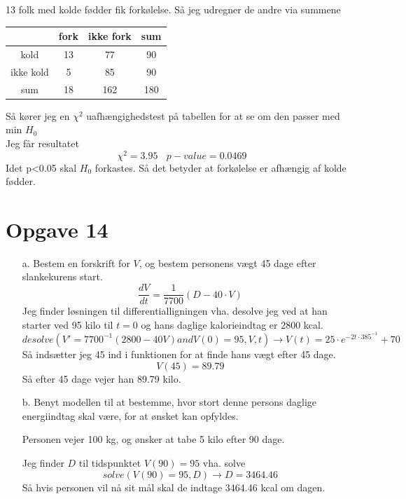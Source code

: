 \documentclass[12pt]{article}
\begin{document}
\begin{enumerate}
                13 folk med kolde fødder fik forkølelse. Så jeg udregner de andre
                via summene
                \begin{center}
                        \begin{tabular}{c | c | c | c}
                                & fork & ikke fork & sum \\ \hline
                                kold &13&77& 90 \\ \hline
                                ikke kold &5&85& 90 \\ \hline
                                sum & 18 & 162 & 180 \\
                        \end{tabular}
                \end{center}
                Så kører jeg en $\chi^2$ uafhængighedstest på tabellen for
                at se om den passer med min $H_0$\\
                Jeg får resultatet
                $$\chi^2 = 3.95~~~~p-value=0.0469$$
                Idet p<0.05 skal $H_0$ forkastes.
                Så det betyder at forkølelse er afhængig af kolde fødder.

\end{enumerate}

\section*{Opgave 14}

\begin{enumerate}

        \item[a.] Bestem en forskrift for $V$, og bestem personens vægt 45 dage
                efter slankekurens start.
                $$\frac{dV}{dt} = \frac{1}{7700}(D-40\cdot V)$$
                Jeg finder løsningen til differentialligningen vha. desolve jeg
                ved at han starter ved 95 kilo til $t = 0$ og hans daglige
                kalorieindtag er 2800 kcal.
                $$desolve(V'=7700^{-1}(2800-40V) and V(0) = 95,V,t) \rightarrow
                V(t) = 25\cdot e^{-2t\cdot 385^{-1}}+70$$
                Så indsætter jeg 45 ind i funktionen for at finde hans vægt
                efter 45 dage.
                $$V(45) = 89.79$$
                Så efter 45 dage vejer han 89.79 kilo.

        \item[b.] Benyt modellen til at bestemme, hvor stort denne persons
                daglige energiindtag skal være, for at ønsket kan opfyldes.

                Personen vejer 100 kg, og ønsker at tabe 5 kilo efter 90 dage.

                Jeg finder $D$ til tidspunktet $V(90)=95$ vha. solve
                $$solve(V(90) = 95,D) \rightarrow D = 3464.46$$
                Så hvis personen vil nå sit mål skal de indtage
                3464.46 kcal om dagen.


\end{enumerate}
\end{document}
